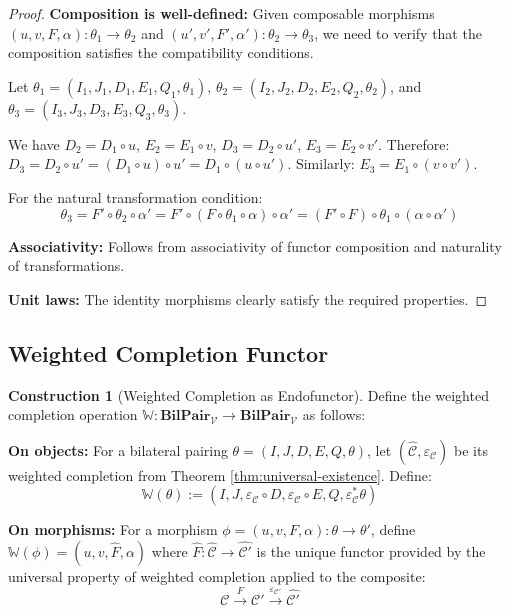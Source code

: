 \documentclass[11pt]{article}
\theoremstyle{plain}
\theoremstyle{definition}
\newtheorem{construction}[theorem]{Construction}
\theoremstyle{remark}
\newcommand{\V}{\mathcal{V}}
\newcommand{\C}{\mathcal{C}}
\newcommand{\wh}[1]{\widehat{#1}}
\begin{document}
\begin{proof}
\textbf{Composition is well-defined:} Given composable morphisms $(u, v, F, \alpha) : \theta_1 \to \theta_2$ and $(u', v', F', \alpha') : \theta_2 \to \theta_3$, we need to verify that the composition satisfies the compatibility conditions.

Let $\theta_1 = (I_1, J_1, D_1, E_1, Q_1, \theta_1)$, $\theta_2 = (I_2, J_2, D_2, E_2, Q_2, \theta_2)$, and $\theta_3 = (I_3, J_3, D_3, E_3, Q_3, \theta_3)$.

We have $D_2 = D_1 \circ u$, $E_2 = E_1 \circ v$, $D_3 = D_2 \circ u'$, $E_3 = E_2 \circ v'$.
Therefore: $D_3 = D_2 \circ u' = (D_1 \circ u) \circ u' = D_1 \circ (u \circ u')$.
Similarly: $E_3 = E_1 \circ (v \circ v')$.

For the natural transformation condition:
$$\theta_3 = F' \circ \theta_2 \circ \alpha' = F' \circ (F \circ \theta_1 \circ \alpha) \circ \alpha' = (F' \circ F) \circ \theta_1 \circ (\alpha \circ \alpha')$$

\textbf{Associativity:} Follows from associativity of functor composition and naturality of transformations.

\textbf{Unit laws:} The identity morphisms clearly satisfy the required properties.
\end{proof}

\subsection{Weighted Completion Functor}

\begin{construction}[Weighted Completion as Endofunctor]\label{const:completion-functor}
Define the weighted completion operation $\mathbb{W} : \mathbf{BilPair}_\V \to \mathbf{BilPair}_\V$ as follows:

\textbf{On objects:} For a bilateral pairing $\theta = (I, J, D, E, Q, \theta)$, let $(\wh{\C}, \varepsilon_\C)$ be its weighted completion from Theorem \ref{thm:universal-existence}. Define:
$$\mathbb{W}(\theta) := (I, J, \varepsilon_\C \circ D, \varepsilon_\C \circ E, Q, \varepsilon_\C^* \theta)$$

\textbf{On morphisms:} For a morphism $\phi = (u, v, F, \alpha) : \theta \to \theta'$, define $\mathbb{W}(\phi) = (u, v, \wh{F}, \alpha)$ where $\wh{F} : \wh{\C} \to \wh{\C'}$ is the unique functor provided by the universal property of weighted completion applied to the composite:
$$\C \xrightarrow{F} \C' \xrightarrow{\varepsilon_{\C'}} \wh{\C'}$$
\end{construction}
\end{document}
